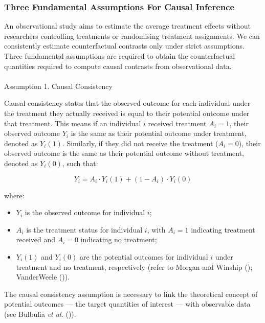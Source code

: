\documentclass[
  single column]{article}
\makeatletter
\let\oldparagraph\paragraph
\renewcommand{\paragraph}{
    \@ifstar
      \xxxParagraphStar
      \xxxParagraphNoStar
  }
\newcommand{\xxxParagraphStar}[1]{\oldparagraph*{#1}\mbox{}}
\newcommand{\xxxParagraphNoStar}[1]{\oldparagraph{#1}\mbox{}}
\providecommand{\tightlist}{%
  \setlength{\itemsep}{0pt}\setlength{\parskip}{0pt}}\usepackage{longtable,booktabs,array}
\makeatother
\begin{document}
\subsubsection{Three Fundamental Assumptions For Causal
Inference}\label{three-fundamental-assumptions-for-causal-inference}

An observational study aims to estimate the average treatment effects
without researchers controlling treatments or randomising treatment
assignments. We can consistently estimate counterfactual contrasts only
under strict assumptions. Three fundamental assumptions are required to
obtain the counterfactual quantities required to compute causal
contrasts from observational data.

\paragraph{Assumption 1. Causal
Consistency}\label{assumption-1.-causal-consistency}

Causal consistency states that the observed outcome for each individual
under the treatment they actually received is equal to their potential
outcome under that treatment. This means if an individual \(i\) received
treatment \(A_i = 1\), their observed outcome \(Y_i\) is the same as
their potential outcome under treatment, denoted as \(Y_i(1)\).
Similarly, if they did not receive the treatment (\(A_i = 0\)), their
observed outcome is the same as their potential outcome without
treatment, denoted as \(Y_i(0)\), such that:

\[
Y_i = A_i \cdot Y_i(1) + (1 - A_i) \cdot Y_i(0)
\]

where:

\begin{itemize}
\tightlist
\item
  \(Y_i\) is the observed outcome for individual \(i\);
\item
  \(A_i\) is the treatment status for individual \(i\), with \(A_i = 1\)
  indicating treatment received and \(A_i = 0\) indicating no treatment;
\item
  \(Y_i(1)\) and \(Y_i(0)\) are the potential outcomes for individual
  \(i\) under treatment and no treatment, respectively (refer to Morgan
  and Winship (); VanderWeele
  ()).
\end{itemize}

The causal consistency assumption is necessary to link the theoretical
concept of potential outcomes --- the target quantities of interest ---
with observable data (see Bulbulia \emph{et al.}
()).
\end{document}
